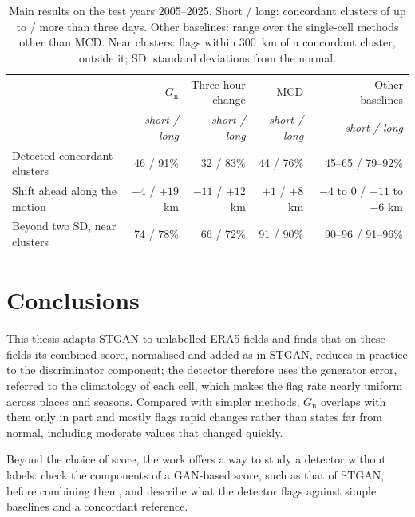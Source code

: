 \documentclass[11pt,a4paper]{article}
\newcommand{\Gn}{$G_{\mathrm{n}}$}
\newcommand{\rigasottile}{\arrayrulecolor{black!18}\specialrule{0.3pt}{1.5pt}{1.5pt}\arrayrulecolor{black}}
\begin{document}
\begin{table}[htb]
\centering
\small
\caption{Main results on the test years 2005--2025. Short / long: concordant clusters of up to / more than three days.
Other baselines: range over the single-cell methods other than MCD. Near clusters: flags within 300~km of a concordant
cluster, outside it; SD: standard deviations from the normal.}
\label{tab:summary-results}
\begin{tabularx}{\textwidth}{@{}>{\raggedright\arraybackslash}X r r r r@{}}
\toprule
 & \Gn & \shortstack[r]{Three-hour\\change} & MCD & \shortstack[r]{Other\\baselines} \\
 & \textit{short / long} & \textit{short / long} & \textit{short / long} & \textit{short / long} \\
\midrule
Detected concordant clusters & 46 / 91\% & 32 / 83\% & 44 / 76\% & 45--65 / 79--92\% \\ \rigasottile
Shift ahead along the motion & $-4$ / $+19$ km & $-11$ / $+12$ km & $+1$ / $+8$ km & $-4$ to $0$ / $-11$ to $-6$ km \\ \rigasottile
Beyond two SD, near clusters & 74 / 78\% & 66 / 72\% & 91 / 90\% & 90--96 / 91--96\% \\
\bottomrule
\end{tabularx}
\end{table}

\section{Conclusions}

This thesis adapts STGAN to unlabelled ERA5 fields and finds that on these fields its combined score, normalised and added as in STGAN, reduces in practice to the discriminator component; the detector therefore uses the generator error, referred to the climatology of each cell, which makes the flag rate nearly uniform across places and seasons. Compared with simpler methods, \Gn{} overlaps with them only in part and mostly flags rapid changes rather than states far from normal, including moderate values that changed quickly.

Beyond the choice of score, the work offers a way to study a detector without labels: check the components of a GAN-based score, such as that of STGAN, before combining them, and describe what the detector flags against simple baselines and a concordant reference.
\end{document}
